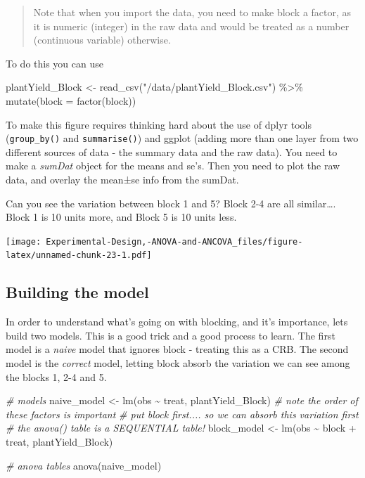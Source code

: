 \documentclass[
]{book}
\newenvironment{Shaded}{\begin{snugshade}}{\end{snugshade}}
\newcommand{\AttributeTok}[1]{\textcolor[rgb]{0.77,0.63,0.00}{#1}}
\newcommand{\CommentTok}[1]{\textcolor[rgb]{0.56,0.35,0.01}{\textit{#1}}}
\newcommand{\FunctionTok}[1]{\textcolor[rgb]{0.00,0.00,0.00}{#1}}
\newcommand{\NormalTok}[1]{#1}
\newcommand{\OtherTok}[1]{\textcolor[rgb]{0.56,0.35,0.01}{#1}}
\newcommand{\SpecialCharTok}[1]{\textcolor[rgb]{0.00,0.00,0.00}{#1}}
\newcommand{\StringTok}[1]{\textcolor[rgb]{0.31,0.60,0.02}{#1}}
\begin{document}
\begin{quote}
Note that when you import the data, you need to make block a factor, as it is numeric (integer) in the raw data and would be treated as a number (continuous variable) otherwise.
\end{quote}

To do this you can use

\begin{Shaded}
\begin{Highlighting}[]
\NormalTok{plantYield\_Block }\OtherTok{\textless{}{-}} \FunctionTok{read\_csv}\NormalTok{(}\StringTok{"/data/plantYield\_Block.csv"}\NormalTok{) }\SpecialCharTok{\%\textgreater{}\%} 
  \FunctionTok{mutate}\NormalTok{(}\AttributeTok{block =} \FunctionTok{factor}\NormalTok{(block))}
\end{Highlighting}
\end{Shaded}

To make this figure requires thinking hard about the use of dplyr tools (\texttt{group\_by()} and \texttt{summarise()}) and ggplot (adding more than one layer from two different sources of data - the summary data and the raw data). You need to make a \emph{sumDat} object for the means and se's. Then you need to plot the raw data, and overlay the mean±se info from the sumDat.

Can you see the variation between block 1 and 5? Block 2-4 are all similar\ldots. Block 1 is 10 units more, and Block 5 is 10 units less.

\texttt{[image: Experimental-Design,-ANOVA-and-ANCOVA\_files/figure-latex/unnamed-chunk-23-1.pdf]}

\hypertarget{building-the-model}{%
\subsection{Building the model}\label{building-the-model}}

In order to understand what's going on with blocking, and it's importance, lets build two models. This is a good trick and a good process to learn. The first model is a \emph{naive} model that ignores block - treating this as a CRB. The second model is the \emph{correct} model, letting block absorb the variation we can see among the blocks 1, 2-4 and 5.

\begin{Shaded}
\begin{Highlighting}[]
\CommentTok{\# models}
\NormalTok{naive\_model }\OtherTok{\textless{}{-}} \FunctionTok{lm}\NormalTok{(obs }\SpecialCharTok{\textasciitilde{}}\NormalTok{ treat, plantYield\_Block)}
\CommentTok{\# note the order of these factors is important}
\CommentTok{\# put block first.... so we can absorb this variation first}
\CommentTok{\# the anova() table is a SEQUENTIAL table!}
\NormalTok{block\_model }\OtherTok{\textless{}{-}} \FunctionTok{lm}\NormalTok{(obs }\SpecialCharTok{\textasciitilde{}}\NormalTok{ block }\SpecialCharTok{+}\NormalTok{ treat, plantYield\_Block) }

\CommentTok{\# anova tables}
\FunctionTok{anova}\NormalTok{(naive\_model)}
\end{Highlighting}
\end{Shaded}
\end{document}
